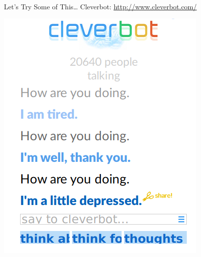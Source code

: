 \documentclass[xcolor={usenames,svgnames,x11names,dvipsnames,table}]{beamer}
\begin{document}
\begin{frame}{Let's Try Some of This\ldots}
    Cleverbot: \href{http://www.cleverbot.com/}{http://www.cleverbot.com/}

    \begin{center}
        \includegraphics[width=.5\linewidth]{./img/cleverbot.png}
    \end{center}
\end{frame}
\end{document}
